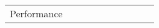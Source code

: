 \begin{table}[]
{\begin{tabular}{|c|c|cccc|cccc|}
                                                                              &                                              &                            &                            &                            &                            &                            &                            &                            &                            \\ \hline
\multirow{2}{*}{Performance}                                                  & \multirow{2}{*}{}                            & \multirow{2}{*}{}          & \multirow{2}{*}{}          & \multirow{2}{*}{}          & \multirow{2}{*}{}          & \multirow{2}{*}{}          & \multirow{2}{*}{}          & \multirow{2}{*}{}          & \multirow{2}{*}{}          \\
                                                                              &                                              &                            &                            &                            &                            &                            &                            &                            &                            \\ \hline
\end{tabular}%
}
\end{table}